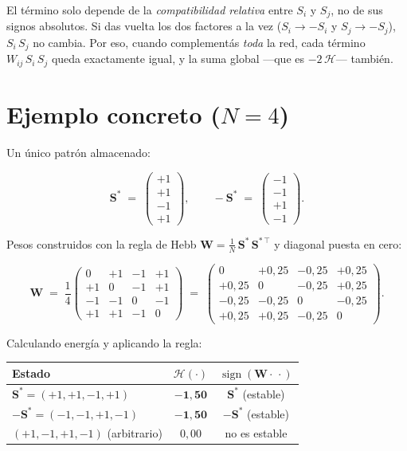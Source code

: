 \documentclass[11pt]{article}
\newcommand{\W}{\mathbf{W}}
\newcommand{\Smat}{\mathbf{S}}
\newcommand{\Hen}{\mathcal{H}}
\begin{document}
El término solo depende de la \emph{compatibilidad relativa} entre $S_i$ y $S_j$, no de sus signos absolutos. Si das vuelta los dos factores a la vez ($S_i \to -S_i$ y $S_j \to -S_j$), $S_i\,S_j$ no cambia. Por eso, cuando complementás \emph{toda} la red, cada término $W_{ij}\,S_i\,S_j$ queda exactamente igual, y la suma global —que es $-2\,\Hen$— también.

\section*{Ejemplo concreto ($N = 4$)}

Un único patrón almacenado:

\[
\Smat^{*} \;=\; \begin{pmatrix} +1 \\ +1 \\ -1 \\ +1 \end{pmatrix},
\qquad
-\Smat^{*} \;=\; \begin{pmatrix} -1 \\ -1 \\ +1 \\ -1 \end{pmatrix}.
\]

Pesos construidos con la regla de Hebb $\W = \frac{1}{N}\,\Smat^{*}\,\Smat^{*\,\top}$ y diagonal puesta en cero:

\[
\W \;=\; \frac{1}{4}\begin{pmatrix}
0 & +1 & -1 & +1 \\
+1 & 0 & -1 & +1 \\
-1 & -1 & 0 & -1 \\
+1 & +1 & -1 & 0
\end{pmatrix}
\;=\;
\begin{pmatrix}
0 & +0{,}25 & -0{,}25 & +0{,}25 \\
+0{,}25 & 0 & -0{,}25 & +0{,}25 \\
-0{,}25 & -0{,}25 & 0 & -0{,}25 \\
+0{,}25 & +0{,}25 & -0{,}25 & 0
\end{pmatrix}.
\]

Calculando energía y aplicando la regla:

\begin{center}
\renewcommand{\arraystretch}{1.25}
\begin{tabular}{l c c}
\toprule
Estado & $\Hen(\cdot)$ & $\operatorname{sign}(\W\cdot\,\cdot)$ \\
\midrule
$\Smat^{*} = (+1,+1,-1,+1)$ & $\mathbf{-1{,}50}$ & $\Smat^{*}$ \quad\textcolor{verde}{(estable)} \\
$-\Smat^{*} = (-1,-1,+1,-1)$ & $\mathbf{-1{,}50}$ & $-\Smat^{*}$ \quad\textcolor{verde}{(estable)} \\
$(+1,-1,+1,-1)$ \;(arbitrario) & $0{,}00$ & no es estable \\
\bottomrule
\end{tabular}
\end{center}
\end{document}
